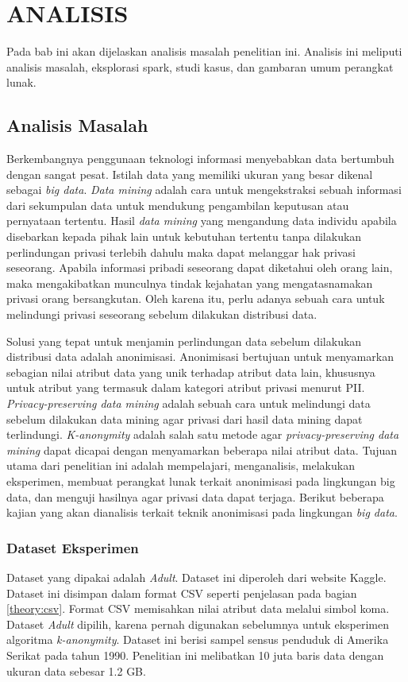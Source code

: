 \chapter{ANALISIS}
Pada bab ini akan dijelaskan analisis masalah penelitian ini. Analisis ini meliputi analisis masalah, eksplorasi spark, studi kasus, dan gambaran umum perangkat lunak.

\section{Analisis Masalah}
Berkembangnya penggunaan teknologi informasi menyebabkan data bertumbuh dengan sangat pesat. Istilah data yang memiliki ukuran yang besar dikenal sebagai \textit{big data}. \textit{Data mining} adalah cara untuk mengekstraksi sebuah informasi dari sekumpulan data untuk mendukung pengambilan keputusan atau pernyataan tertentu. Hasil \textit{data mining} yang mengandung data individu apabila disebarkan kepada pihak lain untuk kebutuhan tertentu tanpa dilakukan perlindungan privasi terlebih dahulu maka dapat melanggar hak privasi seseorang. Apabila informasi pribadi seseorang dapat diketahui oleh orang lain, maka mengakibatkan munculnya tindak kejahatan yang mengatasnamakan privasi orang bersangkutan. Oleh karena itu, perlu adanya sebuah cara untuk melindungi privasi seseorang sebelum dilakukan distribusi data.

\par Solusi yang tepat untuk menjamin perlindungan data sebelum dilakukan distribusi data adalah anonimisasi. Anonimisasi bertujuan untuk menyamarkan sebagian nilai atribut data yang unik terhadap atribut data lain, khususnya untuk atribut yang termasuk dalam kategori atribut privasi menurut PII. \textit{Privacy-preserving data mining} adalah sebuah cara untuk melindungi data sebelum dilakukan data mining agar privasi dari hasil data mining dapat terlindungi. \textit{K-anonymity} adalah salah satu metode agar \textit{privacy-preserving data mining} dapat dicapai dengan menyamarkan beberapa nilai atribut data. Tujuan utama dari penelitian ini adalah mempelajari, menganalisis, melakukan eksperimen, membuat perangkat lunak terkait anonimisasi pada lingkungan big data, dan menguji hasilnya agar privasi data dapat terjaga. Berikut beberapa kajian yang akan dianalisis terkait teknik anonimisasi pada lingkungan \textit{big data}.

\subsection{Dataset Eksperimen}
Dataset yang dipakai adalah \textit{Adult}. Dataset ini diperoleh dari website Kaggle. Dataset ini disimpan dalam format CSV seperti penjelasan pada bagian \ref{theory:csv}. Format CSV memisahkan nilai atribut data melalui simbol koma. Dataset \textit{Adult} dipilih, karena pernah digunakan sebelumnya untuk eksperimen algoritma \textit{k-anonymity}. Dataset ini berisi sampel sensus penduduk di Amerika Serikat pada tahun 1990. Penelitian ini melibatkan 10 juta baris data dengan ukuran data sebesar 1.2 GB. 

